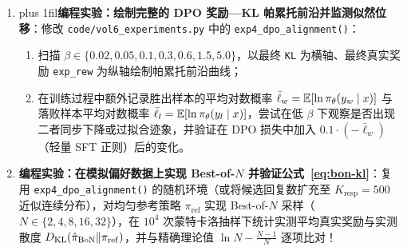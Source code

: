 \begin{enumerate}
  \item[\textbf{6.4.7}] {\rightskip=0pt plus 1fil\relax \textbf{编程实验：绘制完整的 DPO 奖励—KL 帕累托前沿并监测似然位移}：修改 \texttt{code/vol6\_experiments.py} 中的 \texttt{exp4\_dpo\_alignment()}：\par}
  \begin{enumerate}
    \item 扫描 $\beta \in \{0.02, 0.05, 0.1, 0.3, 0.6, 1.5, 5.0\}$，以最终 \texttt{KL} 为横轴、最终真实奖励 \texttt{exp\_rew} 为纵轴绘制帕累托前沿曲线；
    \item 在训练过程中额外记录胜出样本的平均对数概率 $\bar{\ell}_w = \mathbb{E}[\ln \pi_\theta(y_w\mid x)]$ 与落败样本平均对数概率 $\bar{\ell}_l = \mathbb{E}[\ln \pi_\theta(y_l\mid x)]$，尝试在低 $\beta$ 下观察是否出现二者同步下降或过拟合迹象，并验证在 DPO 损失中加入 $0.1 \cdot (-\bar{\ell}_w)$（轻量 SFT 正则）后的变化。
  \end{enumerate}

  \item[\textbf{6.4.8}] \textbf{编程实验：在模拟偏好数据上实现 Best-of-$N$ 并验证公式~\eqref{eq:bon-kl}}：复用 \texttt{exp4\_dpo\_alignment()} 的随机环境（或将候选回复数扩充至 $K_{\mathrm{resp}} = 500$ 近似连续分布），对均匀参考策略 $\pi_{\mathrm{ref}}$ 实现 Best-of-$N$ 采样（$N \in \{2, 4, 8, 16, 32\}$），在 $10^4$ 次蒙特卡洛抽样下统计实测平均真实奖励与实测散度 $D_{\mathrm{KL}}(\hat{\pi}_{\mathrm{BoN}} \| \pi_{\mathrm{ref}})$，并与精确理论值 $\ln N - \frac{N-1}{N}$ 逐项比对！
\end{enumerate}
